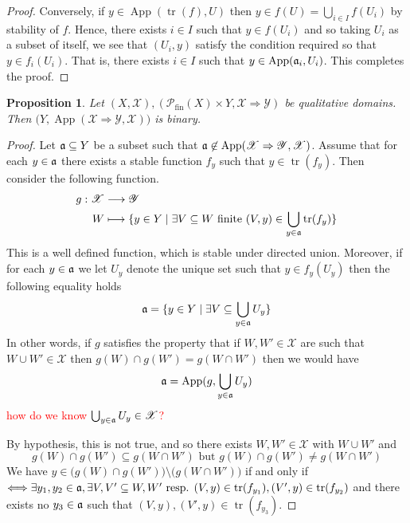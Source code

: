 \documentclass[12pt]{article}
\theoremstyle{plain}
\newtheorem{proposition}[thm]{Proposition}
\theoremstyle{definition}
\newcommand{\scr}[1]{\mathscr{#1}}
\newcommand{\call}[1]{\mathcal{#1}}
\newcommand{\lto}{\longrightarrow}
\begin{document}
\begin{proof}
		Conversely, if $y \in \operatorname{App}(\operatorname{tr}(f), U)$ then $y \in f(U) = \bigcup_{i \in I}f(U_i)$ by stability of $f$. Hence, there exists $i \in I$ such that $y \in f(U_i)$ and so taking $U_i$ as a subset of itself, we see that $(U_i, y)$ satisfy the condition required so that $y \in f_i(U_i)$. That is, there exists $i \in I$ such that $y \in \operatorname{App}(\frak{a}_i, U_i)$. This completes the proof.
		\end{proof}
	
	\begin{proposition}\label{prop:app_binary}
		Let $(X, \scr{X}), (\call{P}_{\text{fin}}(X) \times Y, \scr{X} \Rightarrow \scr{Y})$ be qualitative domains. Then $\big(Y, \operatorname{App}(\scr{X} \Rightarrow \scr{Y}, \scr{X}) \big)$ is binary.
		\end{proposition}
	\begin{proof}
		Let $\frak{a} \subseteq Y$ be a subset such that $\frak{a} \not\in \operatorname{App}(\scr{X} \Rightarrow \scr{Y}, \scr{X})$. Assume that for each $y \in \frak{a}$ there exists a stable function $f_y$ such that $y \in \operatorname{tr}(f_y)$. Then consider the following function.
		\begin{align*}
			g: \scr{X} &\lto \scr{Y}\\
			W &\longmapsto \{ y \in Y \mid \exists V \subseteq W\text{ finite }(V,y) \in \bigcup_{y \in \frak{a}}\operatorname{tr}(f_y) \}
			\end{align*}
		This is a well defined function, which is stable under directed union. Moreover, if for each $y \in \frak{a}$ we let $U_y$ denote the unique set such that $y \in f_y(U_y)$ then the following equality holds
		\begin{equation}
			\frak{a} = \{ y \in Y \mid \exists V \subseteq \bigcup_{y \in \frak{a}}U_y \}
			\end{equation}
		In other words, if $g$ satisfies the property that if $W, W' \in \scr{X}$ are such that $W \cup W' \in \scr{X}$ then $g(W) \cap g(W') = g(W \cap W')$ then we would have
		\begin{equation}
			\frak{a} = \operatorname{App}(g, \bigcup_{y \in \frak{a}}U_y)
			\end{equation}
		\textcolor{red}{how do we know $\bigcup_{y \in \frak{a}}U_y \in \scr{X}$?}
		
		By hypothesis, this is not true, and so there exists $W,W' \in \scr{X}$ with $W \cup W'$ and
		\begin{equation}
			g(W) \cap g(W') \subseteq g(W \cap W') \text{ but } g(W) \cap g(W') \neq g(W \cap W')
			\end{equation}
		We have $y \in \big(g(W) \cap g(W')\big)\setminus\big(g(W \cap W')\big)$ if and only if $\Longleftrightarrow \exists y_1, y_2 \in \frak{a},\exists V,V' \subseteq W,W'\text{ resp. } (V,y) \in \operatorname{tr}(f_{y_1}), (V',y) \in \operatorname{tr}(f_{y_2})$ and there exists no $y_3 \in \frak{a}$ such that $(V,y),(V', y) \in \operatorname{tr}(f_{y_3})$.
		

\end{proof}
\end{document}
